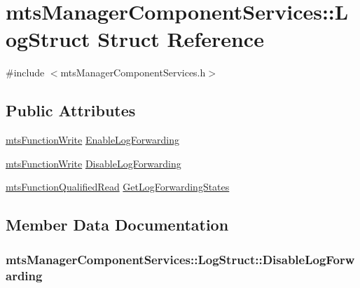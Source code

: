 \hypertarget{structmts_manager_component_services_1_1_log_struct}{}\section{mts\+Manager\+Component\+Services\+:\+:Log\+Struct Struct Reference}
\label{structmts_manager_component_services_1_1_log_struct}


{\ttfamily \#include $<$mts\+Manager\+Component\+Services.\+h$>$}

\subsection*{Public Attributes}
\begin{DoxyCompactItemize}
\item 
\hyperlink{classmts_function_write}{mts\+Function\+Write} \hyperlink{structmts_manager_component_services_1_1_log_struct_aeb9d7421249c425d58f0cff939bb7c12}{Enable\+Log\+Forwarding}
\item 
\hyperlink{classmts_function_write}{mts\+Function\+Write} \hyperlink{structmts_manager_component_services_1_1_log_struct_a81e6b9e5d9cdc2e656d10a4bdd2809f4}{Disable\+Log\+Forwarding}
\item 
\hyperlink{classmts_function_qualified_read}{mts\+Function\+Qualified\+Read} \hyperlink{structmts_manager_component_services_1_1_log_struct_afc7c70d03ea7f0f532e7b9154329d71b}{Get\+Log\+Forwarding\+States}
\end{DoxyCompactItemize}


\subsection{Member Data Documentation}
\hypertarget{structmts_manager_component_services_1_1_log_struct_a81e6b9e5d9cdc2e656d10a4bdd2809f4}{}
\subsubsection[{Disable\+Log\+Forwarding}]{ mts\+Manager\+Component\+Services\+::\+Log\+Struct\+::\+Disable\+Log\+Forwarding}\label{structmts_manager_component_services_1_1_log_struct_a81e6b9e5d9cdc2e656d10a4bdd2809f4}
\hypertarget{structmts_manager_component_services_1_1_log_struct_aeb9d7421249c425d58f0cff939bb7c12}{}

